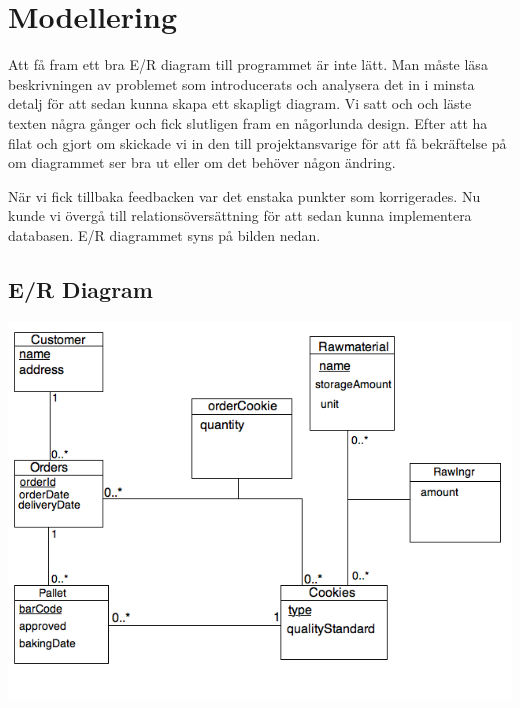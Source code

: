 \section{Modellering}

Att få fram ett bra E/R diagram till programmet är inte lätt. Man måste läsa beskrivningen av problemet som introducerats och analysera det in i minsta detalj för att sedan kunna skapa ett skapligt diagram. Vi satt och och läste texten några gånger och fick slutligen fram en någorlunda design. Efter att ha filat och gjort om skickade vi in den till projektansvarige för att få bekräftelse på om diagrammet ser bra ut eller om det behöver någon ändring. 

När vi fick tillbaka feedbacken var det enstaka punkter som korrigerades. Nu kunde vi övergå till relationsöversättning för att sedan kunna implementera databasen. E/R diagrammet syns på bilden nedan. 

\subsection{E/R Diagram}
\centerline{\includegraphics[scale = 0.6]{er.jpg}}